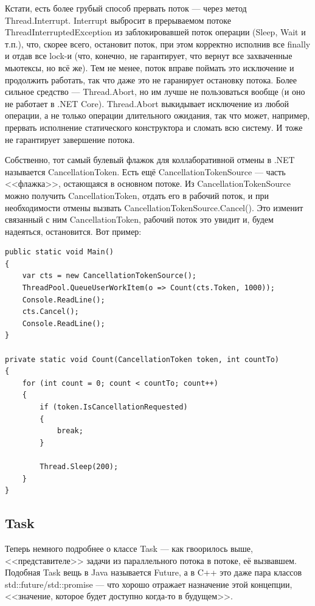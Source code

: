\documentclass[a5paper]{article}
\begin{document}
Кстати, есть более грубый способ прервать поток --- через метод Thread.Interrupt. Interrupt выбросит в прерываемом потоке ThreadInterruptedException из заблокировавшей поток операции (Sleep, Wait и т.п.), что, скорее всего, остановит поток, при этом корректно исполнив все finally и отдав все lock-и (что, конечно, не гарантирует, что вернут все захваченные мьютексы, но всё же). Тем не менее, поток вправе поймать это исключение и продолжить работать, так что даже это не гаранирует остановку потока. Более сильное средство --- Thread.Abort, но им лучше не пользоваться вообще (и оно не работает в .NET Core). Thread.Abort выкидывает исключение из любой операции, а не только операции длительного ожидания, так что может, например, прервать исполнение статического конструктора и сломать всю систему. И тоже не гарантирует завершение потока.

Собственно, тот самый булевый флажок для коллаборативной отмены в .NET называется CancellationToken. Есть ещё CancellationTokenSource --- часть <<флажка>>, остающаяся в основном потоке. Из CancellationTokenSource можно получить CancellationToken, отдать его в рабочий поток, и при необходимости отмены вызвать CancellationTokenSource.Cancel(). Это изменит связанный с ним CancellationToken, рабочий поток это увидит и, будем надеяться, остановится. Вот пример:

\begin{verbatim}
public static void Main() 
{
    var cts = new CancellationTokenSource();
    ThreadPool.QueueUserWorkItem(o => Count(cts.Token, 1000));
    Console.ReadLine();
    cts.Cancel();
    Console.ReadLine();
}

private static void Count(CancellationToken token, int countTo) 
{
    for (int count = 0; count < countTo; count++) 
    {
        if (token.IsCancellationRequested) 
        {
            break;
        }

        Thread.Sleep(200); 
    }
}
\end{verbatim}

\subsection{Task}

Теперь немного подробнее о классе Task --- как гвоорилось выше, <<представителе>> задачи из параллельного потока в потоке, её вызвавшем. Подобная Task вещь в Java называется Future, а в C++ это даже пара классов std::future/std::promise --- что хорошо отражает назначение этой концепции, <<значение, которое будет доступно когда-то в будущем>>. 
\end{document}
